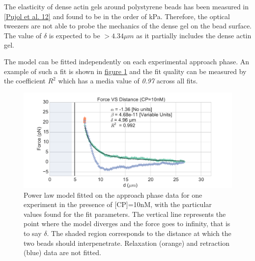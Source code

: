 \documentclass[A4paperpaper,11pt,english]{sphinxmanual}
\begin{document}
The elasticity of dense actin gels around polystyrene beads has been measured
in {\hyperref[index-latex:pujol2012]{{[}Pujol et al. 12{]}}} and found to be in the order of kPa.  Therefore, the
optical tweezers are not able to probe the mechanics of the dense gel on the
bead surface. The value of \(\delta\)  is expected to be \(> 4.34 \mu{}m\) as it partially includes the dense actin gel.

The model can be fitted independently on each experimental
approach phase. An example of such a fit is shown in
\hyperref[index-latex:force-distance-fit]{figure  \ref*{index-latex:force-distance-fit}} and the fit quality can be measured by the
coefficient \(R^2\) which has a media value of \emph{0.97}
across all fits.
\begin{figure}[htbp]
\centering
\capstart

\includegraphics[width=1.000\linewidth]{force-distance-fit.pdf}
\caption{Power law model fitted on the approach phase data for one experiment in the
presence of {[}CP{]}=10nM, with the particular values found for the fit
parameters.  The vertical line represents the point where the model
diverges and the force goes to infinity, that is to say \(\delta\). The
shaded region corresponds to the distance at which the two beads should
interpenetrate. Relaxation (orange) and retraction (blue) data are not fitted.}\label{index-latex:force-distance-fit}\end{figure}
\end{document}
